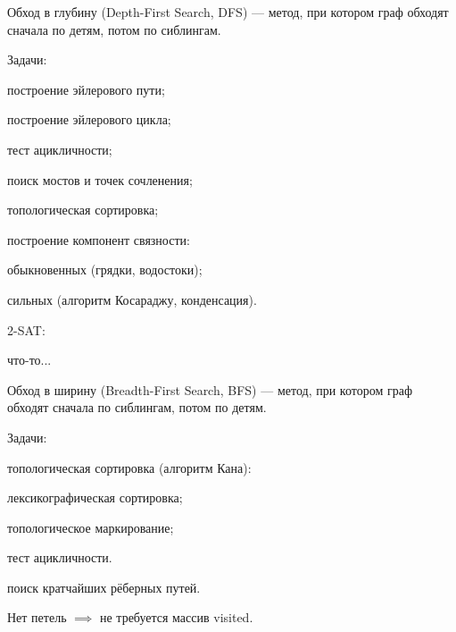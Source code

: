 {\bold Обход в глубину} {\ital (Depth-First Search, DFS)} --- метод, при котором граф обходят сначала по детям, потом по сиблингам.
\begin{theorem}
{\bold Задачи:}
\begin{list*}
\item построение эйлерового пути;
\item построение эйлерового цикла;
\item тест ацикличности;
\item поиск мостов и точек сочленения;
\item топологическая сортировка;
\item построение компонент связности:
\begin{list*}[2]
\item обыкновенных {\ital\color{desc} (грядки, водостоки)};
\item сильных {\ital\color{desc} (алгоритм Косараджу, конденсация)}.
\end{list*}
\item 2-SAT:
\begin{list*}[2]
\item что-то...
\end{list*}
\end{list*}
\end{theorem}
{\bold Обход в ширину} {\ital (Breadth-First Search, BFS)} --- метод, при котором граф обходят сначала по сиблингам, потом по детям.
\begin{theorem}
{\bold Задачи:}
\begin{list*}
\item топологическая сортировка {\ital\color{desc} (алгоритм Кана)}:
\begin{list*}[2]
\item лексикографическая сортировка;
\item топологическое маркирование;
\item тест ацикличности.
\end{list*}
\item поиск кратчайших рёберных путей.
\end{list*}
\end{theorem}

Нет петель $\implies$ не требуется массив {\ital visited}.
